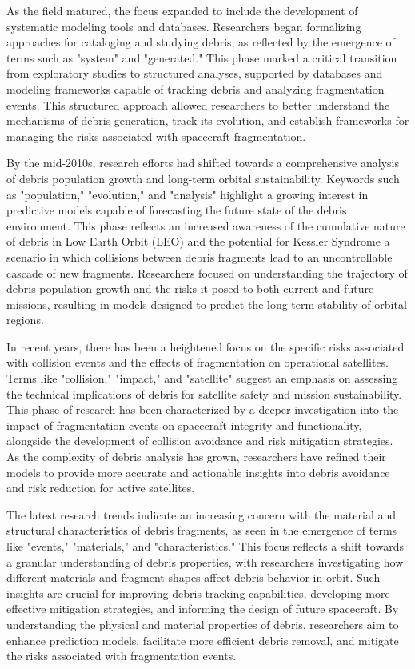 \documentclass[journal ]{new-aiaa}
\begin{document}
As the field matured, the focus expanded to include the development of systematic modeling tools and databases. Researchers began formalizing approaches for cataloging and studying debris, as reflected by the emergence of terms such as "system" and "generated." This phase marked a critical transition from exploratory studies to structured analyses, supported by databases and modeling frameworks capable of tracking debris and analyzing fragmentation events. This structured approach allowed researchers to better understand the mechanisms of debris generation, track its evolution, and establish frameworks for managing the risks associated with spacecraft fragmentation.

By the mid-2010s, research efforts had shifted towards a comprehensive analysis of debris population growth and long-term orbital sustainability. Keywords such as "population," "evolution," and "analysis" highlight a growing interest in predictive models capable of forecasting the future state of the debris environment. This phase reflects an increased awareness of the cumulative nature of debris in Low Earth Orbit (LEO) and the potential for Kessler Syndrome a scenario in which collisions between debris fragments lead to an uncontrollable cascade of new fragments. Researchers focused on understanding the trajectory of debris population growth and the risks it posed to both current and future missions, resulting in models designed to predict the long-term stability of orbital regions.~\cite{kessler_collision_1978}

In recent years, there has been a heightened focus on the specific risks associated with collision events and the effects of fragmentation on operational satellites. Terms like "collision," "impact," and "satellite" suggest an emphasis on assessing the technical implications of debris for satellite safety and mission sustainability. This phase of research has been characterized by a deeper investigation into the impact of fragmentation events on spacecraft integrity and functionality, alongside the development of collision avoidance and risk mitigation strategies. As the complexity of debris analysis has grown, researchers have refined their models to provide more accurate and actionable insights into debris avoidance and risk reduction for active satellites.

The latest research trends indicate an increasing concern with the material and structural characteristics of debris fragments, as seen in the emergence of terms like "events," "materials," and "characteristics." This focus reflects a shift towards a granular understanding of debris properties, with researchers investigating how different materials and fragment shapes affect debris behavior in orbit. Such insights are crucial for improving debris tracking capabilities, developing more effective mitigation strategies, and informing the design of future spacecraft. By understanding the physical and material properties of debris, researchers aim to enhance prediction models, facilitate more efficient debris removal, and mitigate the risks associated with fragmentation events.
\end{document}
